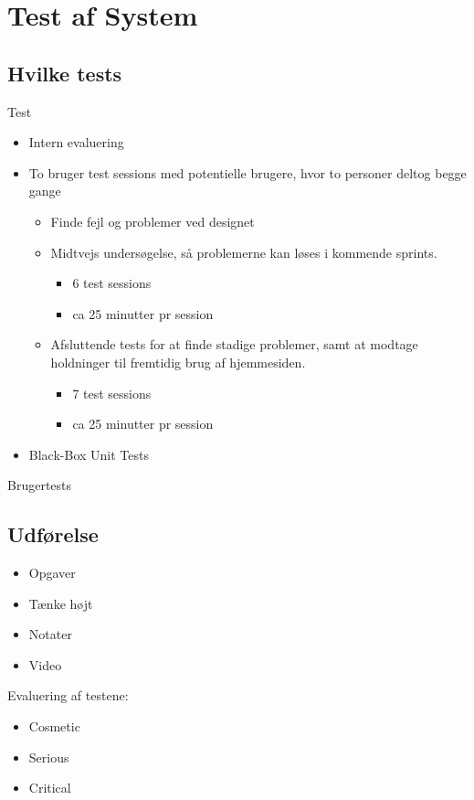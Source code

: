 \section{Test af System}

\subsection{Hvilke tests}
\begin{frame}{Test}
	
	\begin{itemize}
	\item Intern evaluering
	\item	To bruger test sessions med potentielle brugere, hvor to personer deltog begge gange
		\begin{itemize}
			\item Finde fejl og problemer ved designet
			\item Midtvejs undersøgelse, så problemerne kan løses i kommende sprints.
				\begin{itemize}
					\item 6 test sessions
					\item ca 25 minutter pr session
				\end{itemize}
			\item Afsluttende tests for at finde stadige problemer, samt at modtage holdninger til fremtidig brug af hjemmesiden.
				\begin{itemize}
					\item 7 test sessions
					\item ca 25 minutter pr session
				\end{itemize}
		\end{itemize}
	\item 	Black-Box Unit Tests
	
	\end{itemize}
	
\end{frame}

\begin{frame}{Brugertests}
	\subsection{Udførelse}
	
	\begin{itemize}
		\item Opgaver 
		\item Tænke højt
		\item Notater
		\item Video	
	\end{itemize}
	
	Evaluering af testene:
	\begin{itemize}
		\item Cosmetic
		\item Serious
		\item Critical
	\end{itemize}
	
\end{frame}
	
